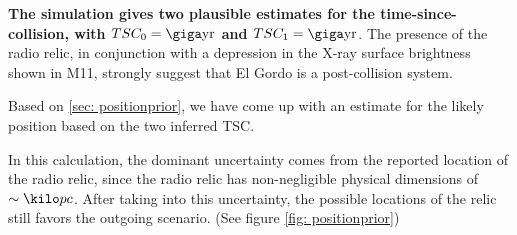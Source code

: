 
\textbf{The simulation gives two plausible estimates for
the time-since-collision, with $TSC_0 = \giga \text{yr}$ and $TSC_1 = \giga
\text{yr}$}. The presence of the radio relic, in conjunction with a
depression in the X-ray surface brightness shown in M11, strongly suggest
that El Gordo is a post-collision system. 

Based on \ref{sec: positionprior}, we have come up with an estimate for the
likely position based on the two inferred TSC. 

In this calculation, the dominant uncertainty comes from the
reported location of the radio relic, since the radio relic has non-negligible
physical dimensions of $\sim \kilo pc$.  After taking into this uncertainty, the possible
locations of the relic still favors the outgoing scenario. (See figure
\ref{fig: positionprior}) 



